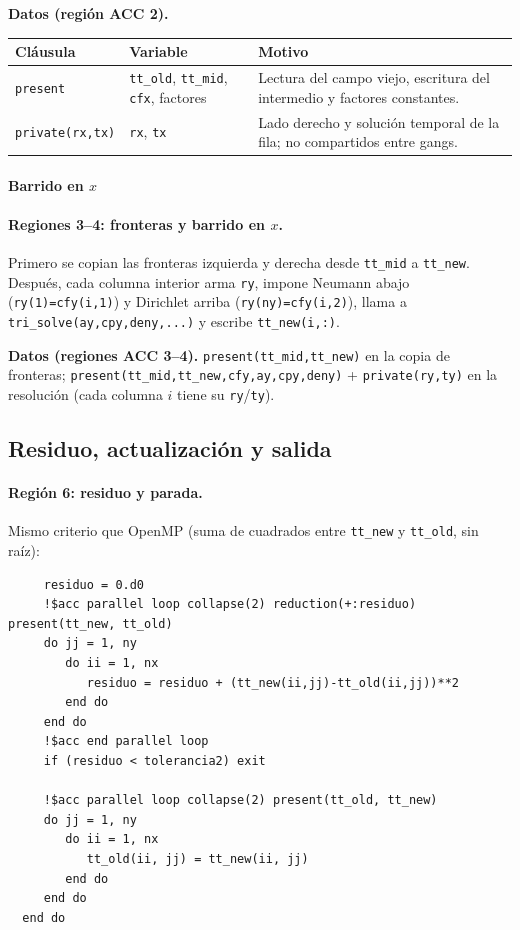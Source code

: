\documentclass[11pt,a4paper]{article}
\begin{document}
\noindent\textbf{Datos (regi\'on ACC 2).}
\begin{center}
\small
\begin{tabular}{lll}
\hline
Cl\'ausula & Variable & Motivo \\
\hline
\texttt{present} & \texttt{tt\_old}, \texttt{tt\_mid}, \texttt{cfx}, factores &
Lectura del campo viejo, escritura del intermedio y factores constantes. \\
\texttt{private(rx,tx)} & \texttt{rx}, \texttt{tx} &
Lado derecho y soluci\'on temporal de la fila; no compartidos entre gangs. \\
\hline
\end{tabular}
\end{center}

\paragraph{Barrido en $x$}

\medskip

\paragraph{Regiones 3--4: fronteras y barrido en $x$.}
Primero se copian las fronteras izquierda y derecha desde \texttt{tt\_mid} a
\texttt{tt\_new}. Despu\'es, cada columna interior arma \texttt{ry}, impone
Neumann abajo (\texttt{ry(1)=cfy(i,1)}) y Dirichlet arriba
(\texttt{ry(ny)=cfy(i,2)}), llama a \texttt{tri\_solve(ay,cpy,deny,...)} y
escribe \texttt{tt\_new(i,:)}.

\noindent\textbf{Datos (regiones ACC 3--4).} \texttt{present(tt\_mid,tt\_new)}
en la copia de fronteras; \texttt{present(tt\_mid,tt\_new,cfy,ay,cpy,deny)} +
\texttt{private(ry,ty)} en la resoluci\'on (cada columna $i$ tiene su
\texttt{ry}/\texttt{ty}).

\subsection{Residuo, actualizaci\'on y salida}
\label{subsec:acc-residuo-salida}

\paragraph{Regi\'on 6: residuo y parada.}
Mismo criterio que OpenMP (suma de cuadrados entre \texttt{tt\_new} y
\texttt{tt\_old}, sin ra\'iz):

\begin{verbatim}
     residuo = 0.d0
     !$acc parallel loop collapse(2) reduction(+:residuo) present(tt_new, tt_old)
     do jj = 1, ny
        do ii = 1, nx
           residuo = residuo + (tt_new(ii,jj)-tt_old(ii,jj))**2
        end do
     end do
     !$acc end parallel loop
     if (residuo < tolerancia2) exit

     !$acc parallel loop collapse(2) present(tt_old, tt_new)
     do jj = 1, ny
        do ii = 1, nx
           tt_old(ii, jj) = tt_new(ii, jj)
        end do
     end do
  end do
\end{verbatim}
\end{document}
